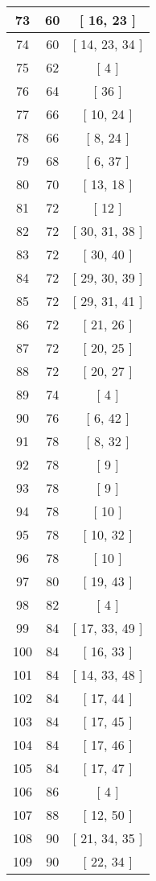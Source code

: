 \begin{center}
\begin{longtable}[H]{|| c c c ||}
73 & 60 & [ 16, 23 ] \\ 
\hline
74 & 60 & [ 14, 23, 34 ] \\ 
\hline
75 & 62 & [ 4 ] \\ 
\hline
76 & 64 & [ 36 ] \\ 
\hline
77 & 66 & [ 10, 24 ] \\ 
\hline
78 & 66 & [ 8, 24 ] \\ 
\hline
79 & 68 & [ 6, 37 ] \\ 
\hline
80 & 70 & [ 13, 18 ] \\ 
\hline
81 & 72 & [ 12 ] \\ 
\hline
82 & 72 & [ 30, 31, 38 ] \\ 
\hline
83 & 72 & [ 30, 40 ] \\ 
\hline
84 & 72 & [ 29, 30, 39 ] \\ 
\hline
85 & 72 & [ 29, 31, 41 ] \\ 
\hline
86 & 72 & [ 21, 26 ] \\ 
\hline
87 & 72 & [ 20, 25 ] \\ 
\hline
88 & 72 & [ 20, 27 ] \\ 
\hline
89 & 74 & [ 4 ] \\ 
\hline
90 & 76 & [ 6, 42 ] \\ 
\hline
91 & 78 & [ 8, 32 ] \\ 
\hline
92 & 78 & [ 9 ] \\ 
\hline
93 & 78 & [ 9 ] \\ 
\hline
94 & 78 & [ 10 ] \\ 
\hline
95 & 78 & [ 10, 32 ] \\ 
\hline
96 & 78 & [ 10 ] \\ 
\hline
97 & 80 & [ 19, 43 ] \\ 
\hline
98 & 82 & [ 4 ] \\ 
\hline
99 & 84 & [ 17, 33, 49 ] \\ 
\hline
100 & 84 & [ 16, 33 ] \\ 
\hline
101 & 84 & [ 14, 33, 48 ] \\ 
\hline
102 & 84 & [ 17, 44 ] \\ 
\hline
103 & 84 & [ 17, 45 ] \\ 
\hline
104 & 84 & [ 17, 46 ] \\ 
\hline
105 & 84 & [ 17, 47 ] \\ 
\hline
106 & 86 & [ 4 ] \\ 
\hline
107 & 88 & [ 12, 50 ] \\ 
\hline
108 & 90 & [ 21, 34, 35 ] \\ 
\hline
109 & 90 & [ 22, 34 ] \\ 

\end{longtable}
\end{center}
